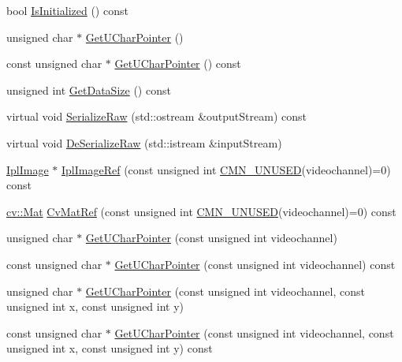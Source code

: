\begin{DoxyCompactItemize}
\item 
bool \hyperlink{classsvl_sample_image_custom_a05a63a27f8d36c3a6d3da3e557401e34}{Is\-Initialized} () const 
\item 
unsigned char $\ast$ \hyperlink{classsvl_sample_image_custom_a20935c430bdfda2b8c2e47cedea54300}{Get\-U\-Char\-Pointer} ()
\item 
const unsigned char $\ast$ \hyperlink{classsvl_sample_image_custom_a98588a912725f4f68429db103ce99638}{Get\-U\-Char\-Pointer} () const 
\item 
unsigned int \hyperlink{classsvl_sample_image_custom_a55e36a7b9db217750f0d826bcc394464}{Get\-Data\-Size} () const 
\item 
virtual void \hyperlink{classsvl_sample_image_custom_a2d467642f90ec4dc898658e6e7dd0e31}{Serialize\-Raw} (std\-::ostream \&output\-Stream) const 
\item 
virtual void \hyperlink{classsvl_sample_image_custom_a068f71a3b20c7853f0930682278ecc6d}{De\-Serialize\-Raw} (std\-::istream \&input\-Stream)
\item 
\hyperlink{svl_types_8h_aa5a40a13021ba9708bfe921e18fdfa53}{Ipl\-Image} $\ast$ \hyperlink{classsvl_sample_image_custom_a7337dcd0860314cfb0780368d1fc2ee4}{Ipl\-Image\-Ref} (const unsigned int \hyperlink{cmn_portability_8h_a021894e2626935fa2305434b1e893ff6}{C\-M\-N\-\_\-\-U\-N\-U\-S\-E\-D}(videochannel)=0) const 
\item 
\hyperlink{namespacecv_a60d81b54f4914bec4cc4a72ab77eb444}{cv\-::\-Mat} \hyperlink{classsvl_sample_image_custom_ae84bf981005e615b3fa8128928d0a156}{Cv\-Mat\-Ref} (const unsigned int \hyperlink{cmn_portability_8h_a021894e2626935fa2305434b1e893ff6}{C\-M\-N\-\_\-\-U\-N\-U\-S\-E\-D}(videochannel)=0) const 
\item 
unsigned char $\ast$ \hyperlink{classsvl_sample_image_custom_a62661fb5cb361956db41ddca64fb8de4}{Get\-U\-Char\-Pointer} (const unsigned int videochannel)
\item 
const unsigned char $\ast$ \hyperlink{classsvl_sample_image_custom_a1c3e87a17fa2483ef99b778f11228ec5}{Get\-U\-Char\-Pointer} (const unsigned int videochannel) const 
\item 
unsigned char $\ast$ \hyperlink{classsvl_sample_image_custom_a1ed7950bd52f718bb21d6614f6197bac}{Get\-U\-Char\-Pointer} (const unsigned int videochannel, const unsigned int x, const unsigned int y)
\item 
const unsigned char $\ast$ \hyperlink{classsvl_sample_image_custom_abba3385b59196b344bbe8cba90013b68}{Get\-U\-Char\-Pointer} (const unsigned int videochannel, const unsigned int x, const unsigned int y) const 

\end{DoxyCompactItemize}
